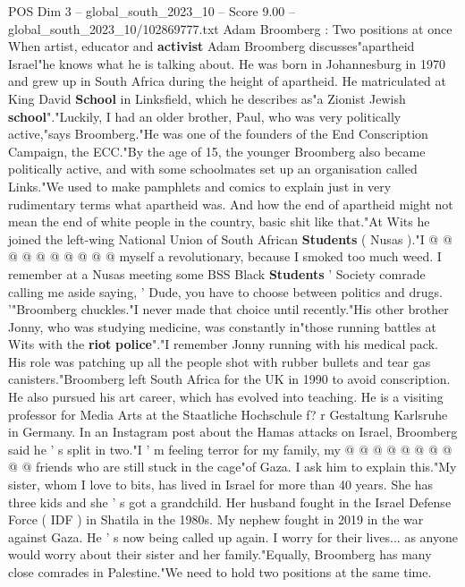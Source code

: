 \begin{textsample}{POS Dim 3 – global\_south\_2023\_10 – Score 9.00 – global\_south\_2023\_10/102869777.txt}  \label{ex:f3_pos_434}
Adam Broomberg : Two positions at once When artist, educator and \textbf{activist} Adam Broomberg discusses"apartheid Israel"he knows what he is talking about.
He was born in Johannesburg in 1970 and grew up in South Africa during the height of apartheid.
He matriculated at King David \textbf{School} in Linksfield, which he describes as"a Zionist Jewish \textbf{school}"."Luckily, I had an older brother, Paul, who was very politically active,"says Broomberg."He was one of the founders of the End Conscription Campaign, the ECC."By the age of 15, the younger Broomberg also became politically active, and with some schoolmates set up an organisation called Links."We used to make pamphlets and comics to explain just in very rudimentary terms what apartheid was.
And how the end of apartheid might not mean the end of white people in the country, basic shit like that."At Wits he joined the left-wing National Union of South African \textbf{Students} ( Nusas )."I @ @ @ @ @ @ @ @ @ @ myself a revolutionary, because I smoked too much weed.
I remember at a Nusas meeting some BSS Black \textbf{Students} ' Society comrade calling me aside saying, ' Dude, you have to choose between politics and drugs. '"Broomberg chuckles."I never made that choice until recently."His other brother Jonny, who was studying medicine, was constantly in"those running battles at Wits with the \textbf{riot} \textbf{police}"."I remember Jonny running with his medical pack.
His role was patching up all the people shot with rubber bullets and tear gas canisters."Broomberg left South Africa for the UK in 1990 to avoid conscription.
He also pursued his art career, which has evolved into teaching.
He is a visiting professor for Media Arts at the Staatliche Hochschule f? r Gestaltung Karlsruhe in Germany.
In an Instagram post about the Hamas attacks on Israel, Broomberg said he ' s split in two."I ' m feeling terror for my family, my @ @ @ @ @ @ @ @ @ @ friends who are still stuck in the cage"of Gaza.
I ask him to explain this."My sister, whom I love to bits, has lived in Israel for more than 40 years.
She has three kids and she ' s got a grandchild.
Her husband fought in the Israel Defense Force ( IDF ) in Shatila in the 1980s.
My nephew fought in 2019 in the war against Gaza.
He ' s now being called up again.
I worry for their lives... as anyone would worry about their sister and her family."Equally, Broomberg has many close comrades in Palestine."We need to hold two positions at the same time.

\end{textsample}

